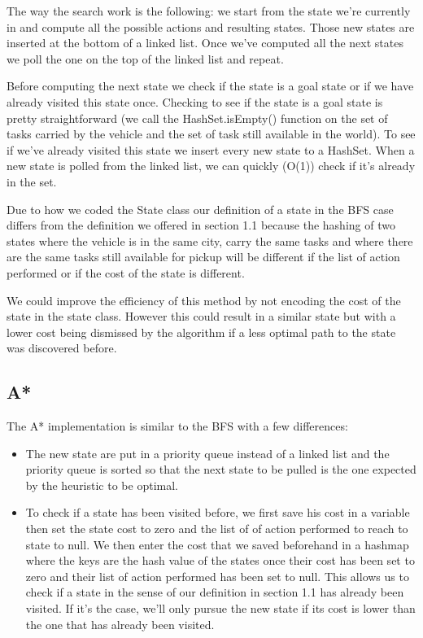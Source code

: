 \documentclass[11pt]{article}
\begin{document}
The way the search work is the following: we start from the state we're currently in and compute all the possible actions and resulting states. Those new states are inserted at the bottom of a linked list. Once we've computed all the next states we poll the one on the top of the linked list and repeat.

Before computing the next state we check if the state is a goal state or if we have already visited this state once. Checking to see if the state is a goal state is pretty straightforward (we call the HashSet.isEmpty() function on the set of tasks carried by the vehicle and the set of task still available in the world). To see if we've already visited this state we insert every new state to a HashSet. When a new state is polled from the linked list, we can quickly (O(1)) check if it's already in the set.

Due to how we coded the State class our definition of a state in the BFS case differs from the definition we offered in section 1.1 because the hashing of two states where the vehicle is in the same city, carry the same tasks and where there are the same tasks still available for pickup will be different if the list of action performed or if the cost of the state is different. 

We could improve the efficiency of this method by not encoding the cost of the state in the state class. However this could result in a similar state but with a lower cost being dismissed by the algorithm if a less optimal path to the state was discovered before.
\subsection{A*}
The A* implementation is similar to the BFS with a few differences:

\begin{itemize}
	\item The new state are put in a priority queue instead of a linked list and the priority queue is sorted so that the next state to be pulled is the one expected by the heuristic to be optimal.
	\item To check if a state has been visited before, we first save his cost in a variable then set the state cost to zero and the list of of action performed to reach to state to null. We then enter the cost that we saved beforehand in a hashmap where the keys are the hash value of the states once their cost has been set to zero and their list of action performed has been set to null. This allows us to check if a state in the sense of our definition in section 1.1 has already been visited. If it's the case, we'll only pursue the new state if its cost is lower than the one that has already been visited.
\end{itemize}
\end{document}
